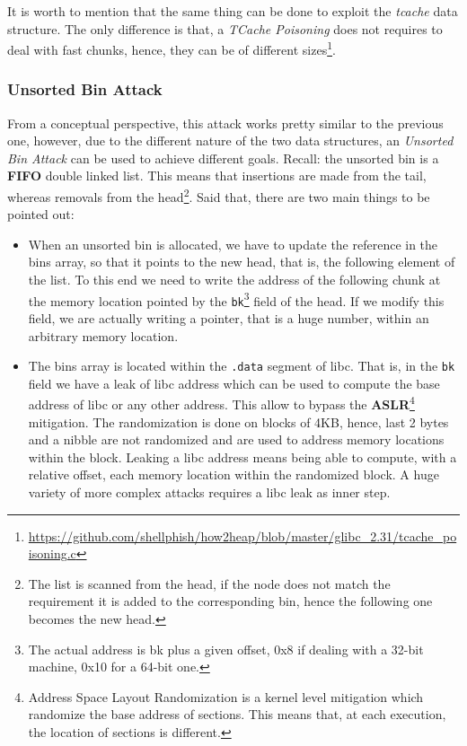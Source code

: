 \documentclass{article}
\numberwithin{equation}{subsection}
\begin{document}
\noindent
It is worth to mention that the same thing can be done to exploit the \emph{tcache} data structure. The only difference is that, a \emph{TCache Poisoning} does not requires to deal with fast chunks, hence, they can be of different sizes\footnote{\href{https://github.com/shellphish/how2heap/blob/master/glibc_2.31/tcache_poisoning.c}{https://github.com/shellphish/how2heap/blob/master/glibc\_2.31/tcache\_poisoning.c}}.
\subsubsection{Unsorted Bin Attack}
From a conceptual perspective, this attack works pretty similar to the previous one, however, due to the different nature of the two data structures, an \emph{Unsorted Bin Attack} can be used to achieve different goals. Recall: the unsorted bin is a \textbf{FIFO} double linked list. This means that insertions are made from the tail, whereas removals from the head\footnote{The list is scanned from the head, if the node does not match the requirement it is added to the corresponding bin, hence the following one becomes the new head.}. Said that, there are two main things to be pointed out:
\begin{itemize}
    \item When an unsorted bin is allocated, we have to update the reference in the bins array, so that it points to the new head, that is, the following element of the list. To this end we need to write the address of the following chunk at the memory location pointed by the \texttt{bk}\footnote{The actual address is bk plus a given offset, 0x8 if dealing with a 32-bit machine, 0x10 for a 64-bit one.} field of the head. If we modify this field, we are actually writing a pointer, that is a huge number, within an arbitrary memory location. 
    \item The bins array is located within the \texttt{.data} segment of libc. That is, in the \texttt{bk} field we have a leak of libc address which can be used to compute the base address of libc or any other address. This allow to bypass the \textbf{ASLR}\footnote{Address Space Layout Randomization is a kernel level mitigation which randomize the base address of sections. This means that, at each execution, the location of sections is different.} mitigation. The randomization is done on blocks of 4KB, hence, last 2 bytes and a nibble are not randomized and are used to address memory locations within the block. Leaking a libc address means being able to compute, with a relative offset, each memory location within the randomized block. A huge variety of more complex attacks requires a libc leak as inner step.
\end{itemize}
\end{document}
